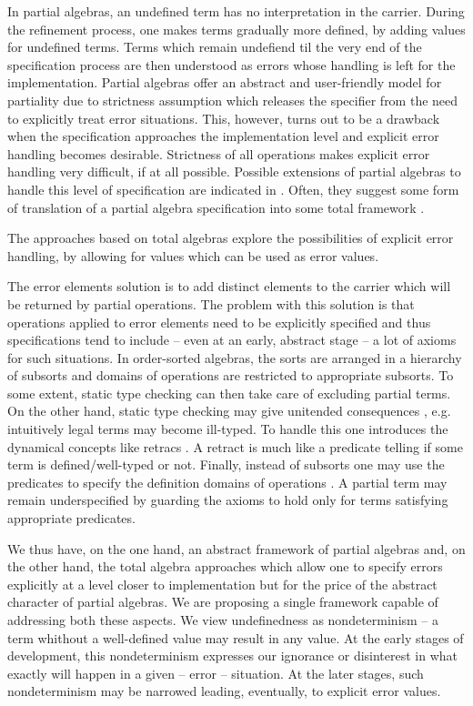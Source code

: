 \documentclass[10pt]{article}
\begin{document}
In
partial algebras, an undefined term has no interpretation in the
carrier. During the refinement process, one makes terms gradually more
defined, by adding values for undefined terms. Terms which remain undefiend
til the very end of the specification process are then understood as errors whose
handling is left for the implementation. Partial algebras offer an
abstract and user-friendly model for partiality due to strictness assumption
which releases the specifier from the need to explicitly treat error
situations. This, however, turns out to be a drawback when the specification
approaches the implementation level and explicit error handling becomes
desirable. Strictness of all operations makes explicit error handling very
difficult, if at all possible. Possible extensions of partial algebras to
handle this level of specification are indicated in \cite{state,lazy}. Often,
they suggest some form of translation of a partial algebra
specification into some total framework \cite{state}.

The approaches based on total algebras explore the possibilities of explicit
error handling, by allowing for values which can be used as error values. 

The error elements solution is  to add distinct elements to the carrier which
will be returned by partial operations. The problem with this solution is
that operations applied to error elements need to be explicitly specified and
thus specifications tend to include -- even at an early, abstract stage -- a
lot of axioms for such situations.
In order-sorted algebras, the sorts are arranged in a hierarchy of subsorts
and domains of operations are restricted to appropriate subsorts. To some
extent, static type checking can then take care of excluding partial
terms. On the other hand, 
static type checking may give unitended consequences \cite{state},
e.g. intuitively legal terms may become ill-typed. To handle this one
introduces the dynamical concepts
like retracs \cite{order}. A retract is much like a
predicate telling if some term is defined/well-typed or not.
Finally, instead of subsorts one may use the predicates to specify the
definition domains of operations \cite{member}. A partial term may remain underspecified by
guarding the axioms to hold only for terms satisfying appropriate predicates.

We thus have, on the one hand, an abstract framework of partial algebras and,
on the other hand, the total algebra approaches which allow one to specify
errors explicitly at a level closer to implementation but for the price
 of the abstract character of partial algebras.
We are proposing a single framework capable of addressing both these
aspects. 
We view undefinedness as nondeterminism -- a term whithout a
well-defined value may result in any value. At the early stages of
development, this nondeterminism expresses our ignorance or disinterest in
what exactly will happen in a given -- error -- situation. At the later
stages, such nondeterminism may be narrowed leading, eventually, to explicit
error values. 
\end{document}
